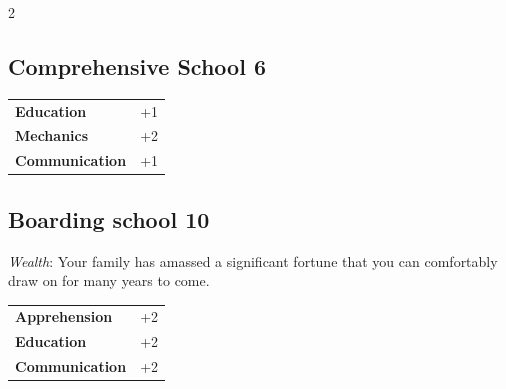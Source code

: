\begin{multicols}{2}
\begin{tcolorbox}

\end{tcolorbox}

\begin{tcolorbox}
    \subsection*{Comprehensive School \hfill \small{6 }}
    \tcblower




\begin{tabular}{@{}ll@{}}
    \textbf{Education} & +1\\
    \textbf{Mechanics} & +2\\
    \textbf{Communication} & +1\\
\end{tabular}


\end{tcolorbox}

\begin{tcolorbox}
    \subsection*{Boarding school \hfill \small{10 }}
    \tcblower
\textit{Wealth}: Your family has amassed a significant fortune that you can comfortably draw on for many years to come.


\vspace{3mm}

\begin{tabular}{@{}ll@{}}
    \textbf{Apprehension} & +2\\
    \textbf{Education} & +2\\
    \textbf{Communication} & +2\\
\end{tabular}


\end{tcolorbox}
\end{multicols}
